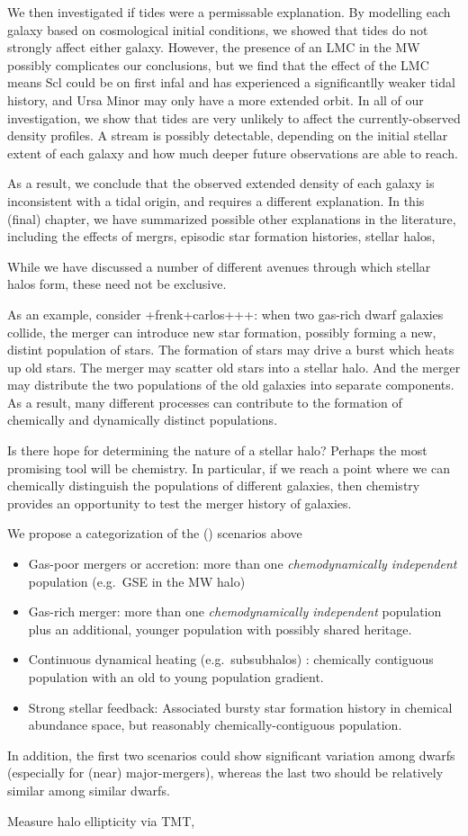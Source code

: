 We then investigated if tides were a permissable explanation. By
modelling each galaxy based on cosmological initial conditions, we
showed that tides do not strongly affect either galaxy. However, the
presence of an LMC in the MW possibly complicates our conclusions, but
we find that the effect of the LMC means Scl could be on first infal and
has experienced a significantlly weaker tidal history, and Ursa Minor
may only have a more extended orbit. In all of our investigation, we
show that tides are very unlikely to affect the currently-observed
density profiles. A stream is possibly detectable, depending on the
initial stellar extent of each galaxy and how much deeper future
observations are able to reach.

As a result, we conclude that the observed extended density of each
galaxy is inconsistent with a tidal origin, and requires a different
explanation. In this (final) chapter, we have summarized possible other
explanations in the literature, including the effects of mergrs,
episodic star formation histories, stellar halos,

While we have discussed a number of different avenues through which
stellar halos form, these need not be exclusive.

As an example, consider +frenk+carlos+++: when two gas-rich dwarf
galaxies collide, the merger can introduce new star formation, possibly
forming a new, distint population of stars. The formation of stars may
drive a burst which heats up old stars. The merger may scatter old stars
into a stellar halo. And the merger may distribute the two populations
of the old galaxies into separate components. As a result, many
different processes can contribute to the formation of chemically and
dynamically distinct populations.

Is there hope for determining the nature of a stellar halo? Perhaps the
most promising tool will be chemistry. In particular, if we reach a
point where we can chemically distinguish the populations of different
galaxies, then chemistry provides an opportunity to test the merger
history of galaxies.

We propose a categorization of the (\LCDM{}) scenarios above

\begin{itemize}
\tightlist
\item
  Gas-poor mergers or accretion: more than one \emph{chemodynamically
  independent} population (e.g.~GSE in the MW halo)
\item
  Gas-rich merger: more than one \emph{chemodynamically independent}
  population plus an additional, younger population with possibly shared
  heritage.
\item
  Continuous dynamical heating (e.g.~subsubhalos) : chemically
  contiguous population with an old to young population gradient.
\item
  Strong stellar feedback: Associated bursty star formation history in
  chemical abundance space, but reasonably chemically-contiguous
  population.
\end{itemize}

In addition, the first two scenarios could show significant variation
among dwarfs (especially for (near) major-mergers), whereas the last two
should be relatively similar among similar dwarfs.

Measure halo ellipticity via TMT, \citet{evslin2016}
